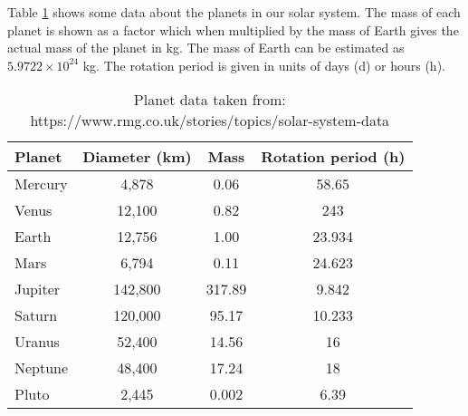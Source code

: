 \documentclass[11pt]{report}
\begin{document}
\begin{Exercise}[title=Modelling using data structures (Essential)]
    
    Table \ref{tab:planets} shows some data about the planets in our solar system. The mass of each planet is shown as a factor which when multiplied by the mass of Earth gives the actual mass of the planet in kg. The mass of Earth can be estimated as $5.9722 \times 10^{24}$ kg. The rotation period is given in units of days (d) or hours (h). 
    \begin{table}
    \begin{center}
    \begin{tabular}{ |l|c|c|c| } 
     \hline
     Planet  & Diameter (km) & Mass  & Rotation period (h)\\ 
     \hline
     Mercury & 4,878           & 0.06  & 58.65 \\ 
     Venus   & 12,100          & 0.82  & 243 \\  
     Earth   & 12,756          & 1.00  & 23.934 \\ 
     Mars    & 6,794          & 0.11  & 24.623 \\ 
     Jupiter & 142,800          & 317.89& 9.842  \\ 
     Saturn  & 120,000          & 95.17 & 10.233 \\ 
     Uranus  & 52,400          & 14.56 & 16 \\ 
     Neptune & 48,400          & 17.24 & 18 \\ 
     Pluto   & 2,445          & 0.002 & 6.39 \\ 
     \hline
    \end{tabular}
    \vspace{0.5em}
    
    \caption{\label{tab:planets} Planet data taken from: https://www.rmg.co.uk/stories/topics/solar-system-data}
    \end{center}
    \end{table}
    
    
    
\end{Exercise}
\end{document}
